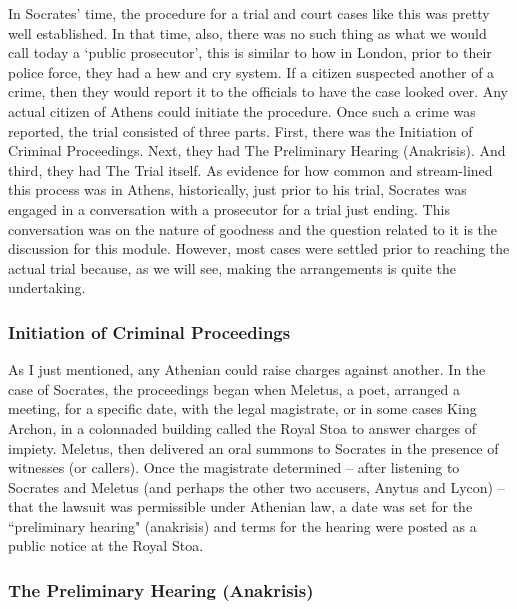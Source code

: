 In Socrates' time, the procedure for a trial and court cases like this was pretty well established. In that time, also, there was no such thing as what we would call today a `public prosecutor', this is similar to how in London, prior to their police force, they had a hew and cry system. If a citizen suspected another of a crime, then they would report it to the officials to have the case looked over. Any actual citizen of Athens could initiate the procedure. Once such a crime was reported, the trial consisted of three parts. First, there was the Initiation of Criminal Proceedings. Next, they had The Preliminary Hearing (Anakrisis). And third, they had The Trial itself. As evidence for how common and stream-lined this process was in Athens, historically, just prior to his trial, Socrates was engaged in a conversation with a prosecutor for a trial just ending. This conversation was on the nature of goodness and the question related to it is the discussion for this module. However, most cases were settled prior to reaching the actual trial because, as we will see, making the arrangements is quite the undertaking.
\subsubsection{Initiation of Criminal Proceedings}

As I just mentioned, any Athenian could raise charges against another. In the case of Socrates, the proceedings began when Meletus, a poet, arranged a meeting, for a specific date, with the legal magistrate, or in some cases King Archon, in a colonnaded building called the Royal Stoa to answer charges of impiety. Meletus, then delivered an oral summons to Socrates in the presence of witnesses (or callers). Once the magistrate determined – after listening to Socrates and Meletus (and perhaps the other two accusers, Anytus and Lycon) – that the lawsuit was permissible under Athenian law, a date was set for the ``preliminary hearing" (anakrisis) and terms for the hearing were posted as a public notice at the Royal Stoa.
\subsubsection{The Preliminary Hearing (Anakrisis)}

